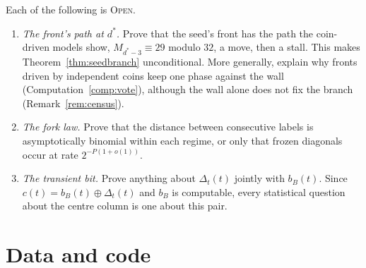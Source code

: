 \documentclass[11pt]{article}
\theoremstyle{definition}
\theoremstyle{remark}
\newcommand{\OPEN}{\textsc{Open}}
\newcommand{\dstar}{d^{*}}
\begin{document}
Each of the following is \OPEN.
\begin{enumerate}[leftmargin=*,itemsep=1pt]
\item \emph{The front's path at $\dstar$.} Prove that the seed's front has the path the coin-driven models show, $M_{\dstar-3}\equiv29$ modulo $32$, a move, then a stall. This makes Theorem~\ref{thm:seedbranch} unconditional. More generally, explain why fronts driven by independent coins keep one phase against the wall (Computation~\ref{comp:vote}), although the wall alone does not fix the branch (Remark~\ref{rem:census}).
\item \emph{The fork law.} Prove that the distance between consecutive labels is asymptotically binomial within each regime, or only that frozen diagonals occur at rate $2^{-P(1+o(1))}$.
\item \emph{The transient bit.} Prove anything about $\Delta_t(t)$ jointly with $b_B(t)$. Since $c(t)=b_B(t)\oplus\Delta_t(t)$ and $b_B$ is computable, every statistical question about the centre column is one about this pair.
\end{enumerate}

\section*{Data and code}
\end{document}
